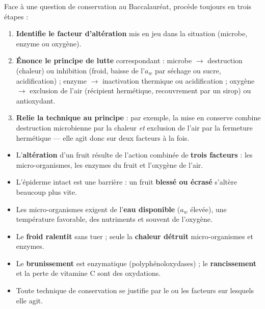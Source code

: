 \documentclass[11pt]{article}
\begin{document}
\begin{methode}
Face à une question de conservation au Baccalauréat, procède toujours en trois étapes :
\begin{enumerate}
\item \textbf{Identifie le facteur d'altération} mis en jeu dans la situation (microbe, enzyme ou oxygène).
\item \textbf{Énonce le principe de lutte} correspondant : microbe $\rightarrow$ destruction (chaleur) ou inhibition (froid, baisse de l'$a_w$ par séchage ou sucre, acidification) ; enzyme $\rightarrow$ inactivation thermique ou acidification ; oxygène $\rightarrow$ exclusion de l'air (récipient hermétique, recouvrement par un sirop) ou antioxydant.
\item \textbf{Relie la technique au principe} : par exemple, la mise en conserve combine destruction microbienne par la chaleur \emph{et} exclusion de l'air par la fermeture hermétique — elle agit donc sur deux facteurs à la fois.
\end{enumerate}
\end{methode}

\begin{aretenir}
\begin{itemize}
\item L'\textbf{altération} d'un fruit résulte de l'action combinée de \textbf{trois facteurs} : les micro-organismes, les enzymes du fruit et l'oxygène de l'air.
\item L'épiderme intact est une barrière : un fruit \textbf{blessé ou écrasé} s'altère beaucoup plus vite.
\item Les micro-organismes exigent de l'\textbf{eau disponible} ($a_w$ élevée), une température favorable, des nutriments et souvent de l'oxygène.
\item Le \textbf{froid ralentit} sans tuer ; seule la \textbf{chaleur détruit} micro-organismes et enzymes.
\item Le \textbf{brunissement} est enzymatique (polyphénoloxydases) ; le \textbf{rancissement} et la perte de vitamine C sont des oxydations.
\item Toute technique de conservation se justifie par le ou les facteurs sur lesquels elle agit.
\end{itemize}
\end{aretenir}
\end{document}
